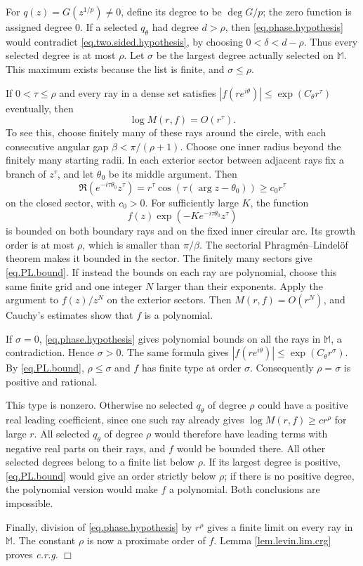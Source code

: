 \documentclass[a4paper,12pt]{article}
\newenvironment{proof}
{\noindent{\it Proof.}}{\hfill $\Box$\par\vspace{2.5mm}}
\numberwithin{equation}{section}
\begin{document}
\begin{proof}
For $q(z)=G(z^{1/p})\ne0$, define its degree to be $\deg G/p$;
the zero function is assigned degree $0$.
If a selected $q_\theta$ had degree $d>\rho$, then \eqref{eq.phase.hypothesis}
would contradict \eqref{eq.two.sided.hypothesis}, by choosing
$0<\delta<d-\rho$.
Thus every selected degree is at most $\rho$.
Let $\sigma$ be the largest degree actually selected on $\mathbb M$.
This maximum exists because the list is finite, and $\sigma\le\rho$.

If $0<\tau\le\rho$ and every ray in a dense set satisfies
$|f(re^{i\theta})|\le\exp(C_\theta r^\tau)$ eventually, then
\begin{equation}\label{eq.PL.bound}
 \log M(r,f)=O(r^\tau).
\end{equation}
To see this, choose finitely many of these rays around the circle, with
each consecutive angular gap $\beta<\pi/(\rho+1)$.
Choose one inner radius beyond the finitely many starting radii.
In each exterior sector between adjacent rays fix a branch of $z^\tau$,
and let $\theta_0$ be its middle argument.
Then
\[
 \Re(e^{-i\tau\theta_0}z^\tau)
 =r^\tau\cos(\tau(\arg z-\theta_0))\ge c_0r^\tau
\]
on the closed sector, with $c_0>0$.
For sufficiently large $K$, the function
\[
 f(z)\exp(-K e^{-i\tau\theta_0}z^\tau)
\]
is bounded on both boundary rays
and on the fixed inner circular arc. Its growth order is at most $\rho$,
which is smaller than $\pi/\beta$.
The sectorial Phragm\'en--Lindel\"of theorem makes it bounded in the sector.
The finitely many sectors give \eqref{eq.PL.bound}.
If instead the bounds on each ray are polynomial, choose this same finite
grid and one integer $N$ larger than their exponents.
Apply the argument to $f(z)/z^N$ on the exterior sectors.
Then $M(r,f)=O(r^N)$, and Cauchy's estimates show that $f$ is a polynomial.

If $\sigma=0$, \eqref{eq.phase.hypothesis} gives polynomial bounds on all
the rays in $\mathbb M$, a contradiction. Hence $\sigma>0$.
The same formula gives $|f(re^{i\theta})|\le\exp(C_\theta r^\sigma)$.
By \eqref{eq.PL.bound}, $\rho\le\sigma$ and $f$ has finite type at order $\sigma$.
Consequently $\rho=\sigma$ is positive and rational.

This type is nonzero. Otherwise no selected $q_\theta$ of degree $\rho$ could
have a positive real leading coefficient, since one such ray already gives
$\log M(r,f)\ge c r^\rho$ for large $r$.
All selected $q_\theta$ of degree $\rho$ would therefore have leading terms
with negative real parts on their rays, and $f$ would be bounded there.
All other selected degrees belong to a finite list below $\rho$.
If its largest degree is positive, \eqref{eq.PL.bound} would give an order
strictly below $\rho$; if there is no positive degree, the polynomial version
would make $f$ a polynomial. Both conclusions are impossible.

Finally, division of \eqref{eq.phase.hypothesis} by $r^\rho$ gives a finite
limit on every ray in $\mathbb M$. The constant $\rho$ is now a proximate
order of $f$. Lemma \ref{lem.levin.lim.crg} proves \textit{c.r.g}.
\end{proof}
\end{document}
